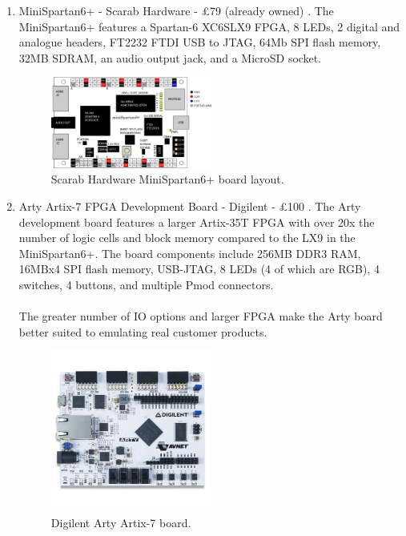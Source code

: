 \documentclass[11pt,a4paper]{report}
\begin{document}
\begin{enumerate}
\item{MiniSpartan6+ - Scarab Hardware - £79 (already owned) \citep{scarabhardware}. The MiniSpartan6+ features a Spartan-6 XC6SLX9 FPGA, 8 LEDs, 2 digital and analogue headers, FT2232 FTDI USB to JTAG, 64Mb SPI flash memory, 32MB SDRAM, an audio output jack, and a MicroSD socket.

\begin{figure}[ht]
\centering
     \includegraphics[width=0.5\textwidth]{minispartan}
      \caption{Scarab Hardware MiniSpartan6+ board layout.}
       \label{fig:res:minispartan}
\end{figure}
}

\item{Arty Artix-7 FPGA Development Board - Digilent - £100 \citep{arty}. The Arty development board features a larger Artix-35T FPGA with over 20x the number of logic cells and block memory compared to the LX9 in the MiniSpartan6+. The board components include 256MB DDR3 RAM, 16MBx4 SPI flash memory, USB-JTAG, 8 LEDs (4 of which are RGB), 4 switches, 4 buttons, and multiple Pmod connectors.
\\\\
The greater number of IO options and larger FPGA make the Arty board better suited to emulating real customer products.


\begin{figure}[ht]
\centering
     \includegraphics[width=0.5\textwidth]{arty}
      \caption{Digilent Arty Artix-7 board.}
       \label{fig:res:arty}
\end{figure}
}
\end{enumerate}
\end{document}
